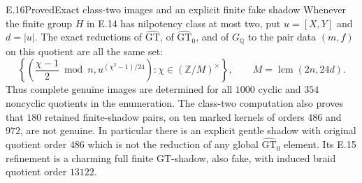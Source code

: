 \begin{statement}{E.16}{Proved}{Exact class-two images and an explicit finite fake shadow}
Whenever the finite group $H$ in E.14 has nilpotency class at
most two, put $u=[X,Y]$ and $d=|u|$. The exact reductions of
$\widehat{\mathrm{GT}}$, of $\widehat{\mathrm{GT}}_0$, and of
$G_{\mathbb Q}$ to the pair data $(m,f)$ on this quotient are
all the same set:
\[
 \left\{\left(\frac{\chi-1}{2}\bmod n,
        u^{(\chi^2-1)/24}\right):
 \chi\in(\mathbb Z/M)^\times\right\},
 \qquad M=\operatorname{lcm}(2n,24d).
\]
Thus complete genuine images are determined for all $1000$
cyclic and $354$ noncyclic quotients in the enumeration.
The class-two computation also proves that $180$ retained
finite-shadow pairs, on ten marked kernels of orders $486$
and $972$, are not genuine. In particular there is an explicit
gentle shadow with original quotient order $486$ which is not
the reduction of any global $\widehat{\mathrm{GT}}_0$ element.
Its E.15 refinement is a charming full finite GT-shadow,
also fake, with induced braid quotient order $13122$.
\end{statement}
